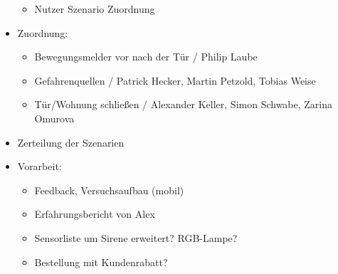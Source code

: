 \begin{itemize}
\begin{itemize}
		\item Nutzer Szenario Zuordnung
	\end{itemize}
	\item Zuordnung:
	\begin{itemize}
		\item Bewegungsmelder vor nach der Tür / Philip Laube
		\item Gefahrenquellen / Patrick Hecker, Martin Petzold, Tobias Weise
		\item Tür/Wohnung schließen / Alexander Keller, Simon Schwabe, Zarina Omurova
	\end{itemize}
	\item Zerteilung der Szenarien
	\item Vorarbeit:
	\begin{itemize}
		\item Feedback, Versuchsaufbau (mobil)
		\item Erfahrungsbericht von Alex
		\item Sensorliste um Sirene erweitert? RGB-Lampe?
		\item Bestellung mit Kundenrabatt?
	\end{itemize}
\end{itemize}

